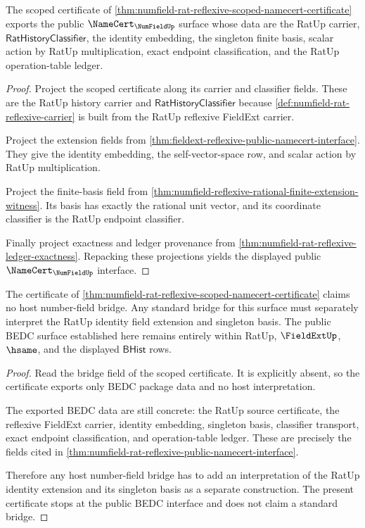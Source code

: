 \begin{theorem}
\label{thm:numfield-rat-reflexive-public-namecert-interface}
The scoped certificate of
\autoref{thm:numfield-rat-reflexive-scoped-namecert-certificate} exports the
public $\NameCert_{\NumFieldUp}$ surface whose data are the RatUp carrier,
$\mathsf{RatHistoryClassifier}$, the identity embedding, the singleton finite
basis, scalar action by RatUp multiplication, exact endpoint classification,
and the RatUp operation-table ledger.
\end{theorem}
\begin{proof}
Project the scoped certificate along its carrier and classifier fields. These
are the RatUp history carrier and $\mathsf{RatHistoryClassifier}$ because
\autoref{def:numfield-rat-reflexive-carrier} is built from the RatUp reflexive
FieldExt carrier.

Project the extension fields from
\autoref{thm:fieldext-reflexive-public-namecert-interface}. They give the
identity embedding, the self-vector-space row, and scalar action by RatUp
multiplication.

Project the finite-basis field from
\autoref{thm:numfield-reflexive-rational-finite-extension-witness}. Its basis
has exactly the rational unit vector, and its coordinate classifier is the
RatUp endpoint classifier.

Finally project exactness and ledger provenance from
\autoref{thm:numfield-rat-reflexive-ledger-exactness}. Repacking these
projections yields the displayed public $\NameCert_{\NumFieldUp}$ interface.
\end{proof}

\begin{theorem}
\label{thm:numfield-rat-reflexive-standard-bridge-boundary}
The certificate of
\autoref{thm:numfield-rat-reflexive-scoped-namecert-certificate} claims no
host number-field bridge. Any standard bridge for this surface must separately
interpret the RatUp identity field extension and singleton basis. The public
BEDC surface established here remains entirely within RatUp, $\FieldExtUp$,
$\hsame$, and the displayed $\mathsf{BHist}$ rows.
\end{theorem}
\begin{proof}
Read the bridge field of the scoped certificate. It is explicitly absent, so
the certificate exports only BEDC package data and no host interpretation.

The exported BEDC data are still concrete: the RatUp source certificate, the
reflexive FieldExt carrier, identity embedding, singleton basis, classifier
transport, exact endpoint classification, and operation-table ledger. These
are precisely the fields cited in
\autoref{thm:numfield-rat-reflexive-public-namecert-interface}.

Therefore any host number-field bridge has to add an interpretation of the
RatUp identity extension and its singleton basis as a separate construction.
The present certificate stops at the public BEDC interface and does not claim a
standard bridge.
\end{proof}

